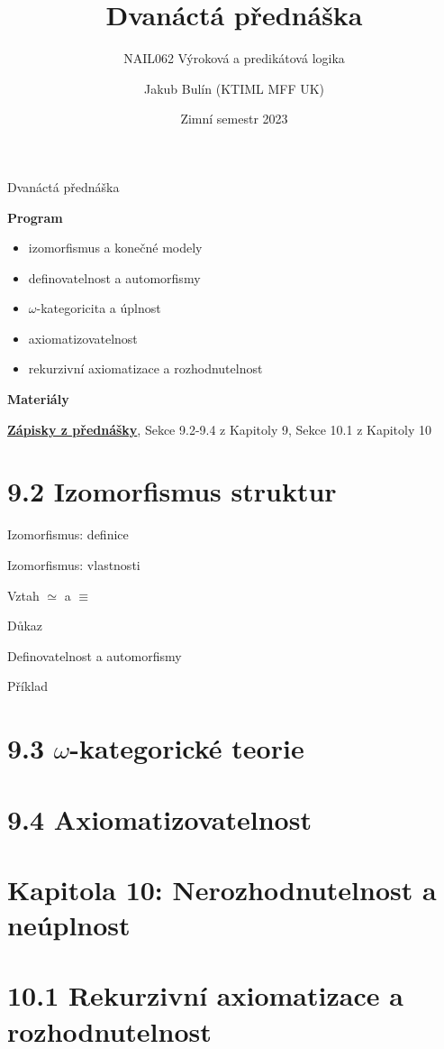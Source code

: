 \documentclass{beamer}
\title{Dvanáctá přednáška}
\subtitle{NAIL062 Výroková a predikátová logika}
\author{Jakub Bulín (KTIML MFF UK)}
\date{Zimní semestr 2023}
\begin{document}
\frame{\titlepage}


\begin{frame}{Dvanáctá přednáška}

    \textbf{Program}
        \begin{itemize}
            \item izomorfismus a konečné modely
            \item definovatelnost a automorfismy
            \item $\omega$-kategoricita a úplnost
            \item axiomatizovatelnost
            \item rekurzivní axiomatizace a rozhodnutelnost
        \end{itemize}

    \textbf{Materiály}

        \href{https://github.com/jbulin-mff-uk/nail062/raw/main/lecture/lecture-notes/lecture-notes.pdf}{\alert{\textbf{Zápisky z přednášky}}}, Sekce 9.2-9.4 z Kapitoly 9, Sekce 10.1 z Kapitoly 10

\end{frame}


\section{9.2 Izomorfismus struktur}


\begin{frame}{Izomorfismus: definice}
        

\end{frame}


\begin{frame}{Izomorfismus: vlastnosti}
        

\end{frame}


\begin{frame}{Vztah $\simeq$ a $\equiv$}
        

\end{frame}


\begin{frame}{Důkaz}

    
\end{frame}


\begin{frame}{Definovatelnost a automorfismy}

    
\end{frame}


\begin{frame}{Příklad}

    
\end{frame}


\section{9.3 $\omega$-kategorické teorie}


\section{9.4 Axiomatizovatelnost}


\section{\sc Kapitola 10: Nerozhodnutelnost a neúplnost}


\section{10.1 Rekurzivní axiomatizace a rozhodnutelnost}
\end{document}
